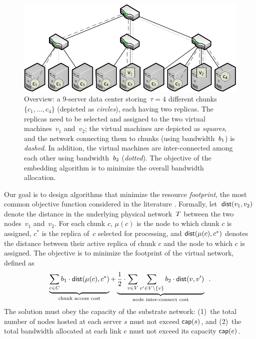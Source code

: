 \begin{figure}[t]
\centering
\includegraphics[width=0.79\columnwidth]{figs/static-mapping/data_locality_no_legend.pdf}
\caption{Overview: a 9-server data center storing~$\tau=4$ different chunks~$\{c_1,\ldots,c_4\}$ (depicted as \emph{circles}), each having two replicas. The replicas need to be selected and assigned to the two
 virtual machines~$v_1$ and~$v_2$; the virtual machines are depicted as \emph{squares}, and
 the network connecting them to chunks (using bandwidth~$b_1$) is \emph{dashed}. In addition, the virtual machines are inter-connected among
 each other using bandwidth~$b_2$ (\emph{dotted}). The objective of the embedding algorithm is to minimize the overall bandwidth allocation.}\label{fig:overview}
\end{figure}


Our goal is to design algorithms that minimize the resource \emph{footprint}, the most common objective function considered in the literature \cite{fischer-survey}.
Formally, let~$\mathrm{\textsf{dist}}(v_1,v_2)$ denote the distance in the underlying physical network~$T$ between the two nodes~$v_1$ and~$v_2$.
For each chunk $c$,
$\mu(c)$ is the node to which chunk $c$ is assigned,
$c^*$ is the replica of~$c$ selected for processing,
and $\mathrm{\textsf{dist}}(\mu(c), c^*)$ denotes the distance between their active replica of chunk $c$ and the node to which $c$ is assigned.
The objective is to minimize the footprint of the virtual network, defined as
$$
\underbrace{\sum_{c \in C} b_1 \cdot \mathrm{\textsf{dist}}(\mu(c), c^*)}_{\text{chunk access cost}} +  \underbrace{\frac{1}{2} \cdot \sum_{v\in V} \sum_{v' \in V\setminus\{v\}} b_2 \cdot \mathrm{\textsf{dist}}(v,v')}_{\text{node inter-connect cost}}\enspace.
$$
The solution must obey the capacity of the substrate network: (1)~the total number of nodes hosted at each server $s$ must not exceed $\textsf{cap}(s)$, and (2)~the total bandwidth allocated at each link $e$ must not exceed its capacity $\textsf{cap}(e)$.

